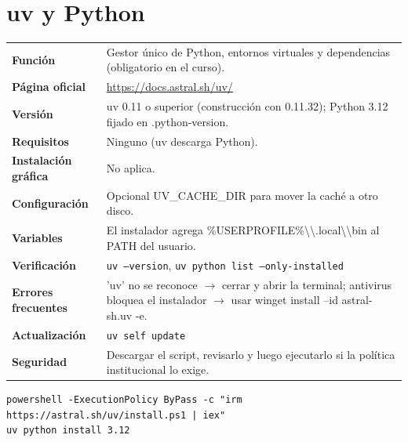 \section{uv y Python}
{\small\begin{tabularx}{\linewidth}{@{}>{\bfseries}p{2.9cm}X@{}}\toprule
Función & Gestor único de Python, entornos virtuales y dependencias (obligatorio en el curso).\\
Página oficial & \url{https://docs.astral.sh/uv/}\\
Versión & uv 0.11 o superior (construcción con 0.11.32); Python 3.12 fijado en .python-version.\\
Requisitos & Ninguno (uv descarga Python).\\
Instalación gráfica & No aplica.\\
Configuración & Opcional UV\_CACHE\_DIR para mover la caché a otro disco.\\
Variables & El instalador agrega \%USERPROFILE\%\textbackslash{}\textbackslash{}.local\textbackslash{}\textbackslash{}bin al PATH del usuario.\\
Verificación & \texttt{uv --version}, \texttt{uv python list --only-installed}\\
Errores frecuentes & 'uv' no se reconoce $\rightarrow$ cerrar y abrir la terminal; antivirus bloquea el instalador $\rightarrow$ usar winget install --id astral-sh.uv -e.\\
Actualización & \texttt{uv self update}\\
Seguridad & Descargar el script, revisarlo y luego ejecutarlo si la política institucional lo exige.\\
\bottomrule\end{tabularx}}
\begin{lstlisting}[style=ps]
powershell -ExecutionPolicy ByPass -c "irm https://astral.sh/uv/install.ps1 | iex"
uv python install 3.12
\end{lstlisting}

